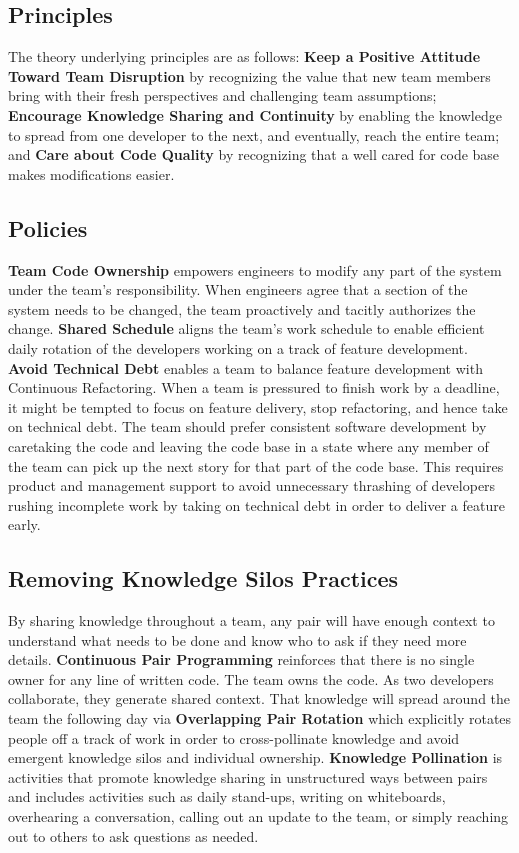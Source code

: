 \subsection{Principles}
The theory underlying principles are as follows: \textbf{Keep a Positive Attitude Toward Team Disruption} by recognizing the value that new team members bring with their fresh perspectives and challenging team assumptions; \textbf{Encourage Knowledge Sharing and Continuity} by enabling the knowledge to spread from one developer to the next, and eventually, reach the entire team; and \textbf{Care about Code Quality} by recognizing that a well cared for code base makes modifications easier. 

\subsection{Policies}
\textbf{Team Code Ownership} empowers engineers to modify any part of the system under the team's responsibility. When engineers agree that a section of the system needs to be changed, the team proactively and tacitly authorizes the change. \textbf{Shared Schedule} aligns the team's work schedule to enable efficient daily rotation of the developers working on a track of feature development. \textbf{Avoid Technical Debt} enables a team to balance feature development with Continuous Refactoring. When a team is pressured to finish work by a deadline, it might be tempted to focus on feature delivery, stop refactoring, and hence take on technical debt. The team should prefer consistent software development by caretaking the code and leaving the code base in a state where any member of the team can pick up the next story for that part of the code base. This requires product and management support to avoid unnecessary thrashing of developers rushing incomplete work by taking on technical debt in order to deliver a feature early.

\subsection{Removing Knowledge Silos Practices}
By sharing knowledge throughout a team, any pair will have enough context to understand what needs to be done and know who to ask if they need more details. \textbf{Continuous Pair Programming} reinforces that there is no single owner for any line of written code. The team owns the code. As two developers collaborate, they generate shared context. That knowledge will spread around the team the following day via \textbf{Overlapping Pair Rotation} which explicitly rotates people off a track of work in order to cross-pollinate knowledge and avoid emergent knowledge silos and individual ownership. \textbf{Knowledge Pollination} is activities that promote knowledge sharing in unstructured ways between pairs and includes activities such as daily stand-ups, writing on whiteboards, overhearing a conversation, calling out an update to the team, or simply reaching out to others to ask questions as needed. 

